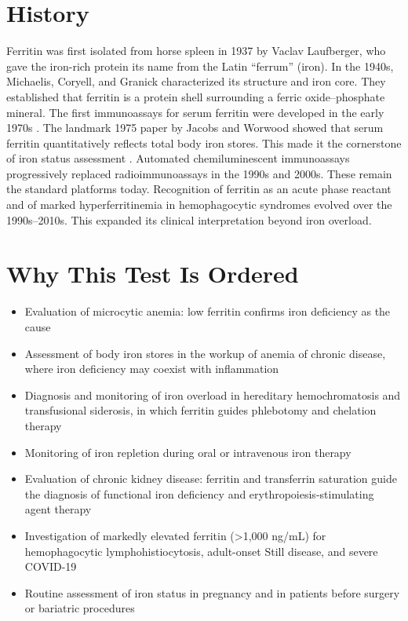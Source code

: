 \section*{History}
Ferritin was first isolated from horse spleen in 1937 by Vaclav Laufberger, who gave the iron-rich protein its name from the Latin ``ferrum'' (iron). In the 1940s, Michaelis, Coryell, and Granick characterized its structure and iron core. They established that ferritin is a protein shell surrounding a ferric oxide--phosphate mineral. The first immunoassays for serum ferritin were developed in the early 1970s \cite{addison1972immunoradiometric}. The landmark 1975 paper by Jacobs and Worwood showed that serum ferritin quantitatively reflects total body iron stores. This made it the cornerstone of iron status assessment \cite{jacobs1975ferritin}. Automated chemiluminescent immunoassays progressively replaced radioimmunoassays in the 1990s and 2000s. These remain the standard platforms today. Recognition of ferritin as an acute phase reactant and of marked hyperferritinemia in hemophagocytic syndromes evolved over the 1990s--2010s. This expanded its clinical interpretation beyond iron overload.
\section*{Why This Test Is Ordered}
\begin{itemize}
  \item Evaluation of microcytic anemia: low ferritin confirms iron deficiency as the cause
  \item Assessment of body iron stores in the workup of anemia of chronic disease, where iron deficiency may coexist with inflammation
  \item Diagnosis and monitoring of iron overload in hereditary hemochromatosis and transfusional siderosis, in which ferritin guides phlebotomy and chelation therapy \cite{bacon2011diagnosis}
  \item Monitoring of iron repletion during oral or intravenous iron therapy
  \item Evaluation of chronic kidney disease: ferritin and transferrin saturation guide the diagnosis of functional iron deficiency and erythropoiesis-stimulating agent therapy
  \item Investigation of markedly elevated ferritin (>1,000 ng/mL) for hemophagocytic lymphohistiocytosis, adult-onset Still disease, and severe COVID-19 \cite{cullis2018investigation}
  \item Routine assessment of iron status in pregnancy and in patients before surgery or bariatric procedures \cite{who2011serumferritin}
\end{itemize}
